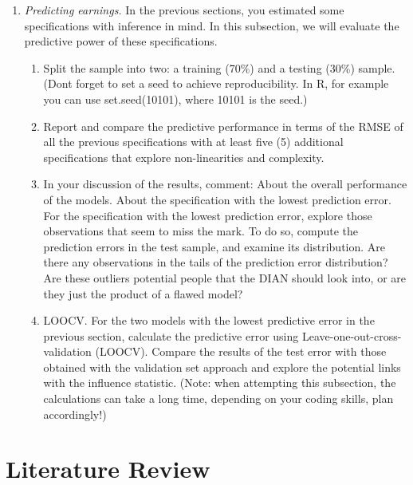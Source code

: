 \documentclass[12pt,a4paper,onecolumn]{article}
\begin{document}
\begin{enumerate}
\begin{enumerate}
    \end{enumerate}
    
    \item \textit{Predicting earnings.} In the previous sections, you estimated some specifications with inference in mind. In this subsection, we will evaluate the predictive power of these specifications.

\begin{enumerate}
    \item Split the sample into two: a training (70\%) and a testing (30\%) sample. (Dont forget to set a seed to achieve reproducibility. In R, for example you can use set.seed(10101), where 10101 is the seed.)
    \item Report and compare the predictive performance in terms of the RMSE of all the previous specifications with at least five (5) additional specifications that explore non-linearities and complexity.
    \item In your discussion of the results, comment:
    About the overall performance of the models.
    About the specification with the lowest prediction error.
    For the specification with the lowest prediction error, explore those observations that seem to miss the mark. To do so, compute the prediction errors in the test sample, and examine its distribution. Are there any observations in the tails of the prediction error distribution? Are these outliers potential people that the DIAN should look into, or are they just the product of a flawed model?
    \item LOOCV. For the two models with the lowest predictive error in the previous section, calculate the predictive error using Leave-one-out-cross-validation (LOOCV). Compare the results of the test error with those obtained with the validation set approach and explore the potential links with the influence statistic. (Note: when attempting this subsection, the calculations can take a long time, depending on your coding skills, plan accordingly!)
\end{enumerate}

    
\end{enumerate}













\section{Literature Review}
\end{document}
